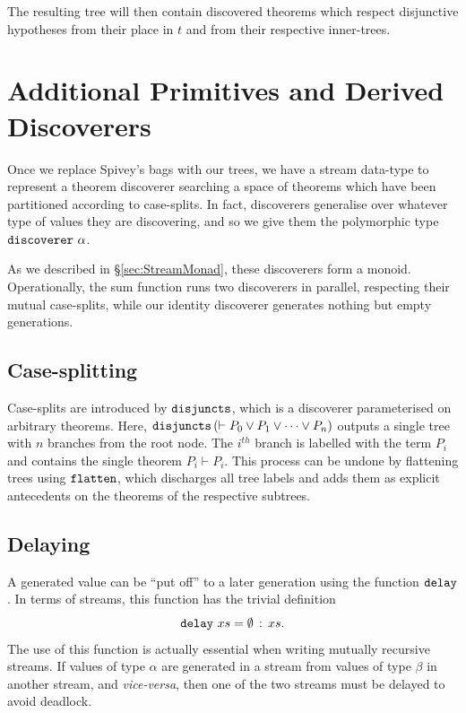 The resulting tree will then contain discovered theorems which respect disjunctive hypotheses from their place in $t$ and from their respective inner-trees.

\section{Additional Primitives and Derived Discoverers}\label{sec:Additional}
Once we replace Spivey's bags with our trees, we have a stream data-type to represent a theorem discoverer searching a space of theorems which have been partitioned according to case-splits. In fact, discoverers generalise over whatever type of values they are discovering, and so we give them the polymorphic type $\texttt{discoverer}\ \alpha$.  

As we described in \S\ref{sec:StreamMonad}, these discoverers form a monoid. Operationally, the sum function runs two discoverers in parallel, respecting their mutual case-splits, while our identity discoverer generates nothing but empty generations.

\subsection{Case-splitting}
Case-splits are introduced by $\texttt{disjuncts}$, which is a discoverer parameterised on arbitrary theorems. Here, $\texttt{disjuncts}\left(\vdash P_0 \vee P_1 \vee \cdots \vee P_n\right)$ outputs a single tree with $n$ branches from the root node. The $i^{th}$ branch is labelled with the term $P_i$ and contains the single theorem $P_i \vdash P_i$. This process can be undone by flattening trees using $\texttt{flatten}$, which discharges all tree labels and adds them as explicit antecedents on the theorems of the respective subtrees.

\subsection{Delaying}
A generated value can be ``put off'' to a later generation using the function $\texttt{delay}$. In terms of streams, this function has the trivial definition
\begin{displaymath}
  \texttt{delay}\ xs = \emptyset\,:\,xs.
\end{displaymath}
The use of this function is actually essential when writing mutually recursive streams. If values of type $\alpha$ are generated in a stream from values of type $\beta$ in another stream, and \emph{vice-versa}, then one of the two streams must be delayed to avoid deadlock.

